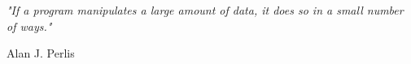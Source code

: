 \documentclass[11pt, a4paper, oneside]{Thesis} %
\begin{document}
\clearpage %



\clearpage %


\pagestyle{empty} %

\null\vfill %

\begin{flushleft}
\textit{"If a program manipulates a large amount of data, it does so in a small number of ways."}
\end{flushleft}


\begin{flushright}
Alan J. Perlis
\end{flushright}

\vfill\vfill\vfill\vfill\vfill\vfill\null %

\clearpage %


\end{document}
